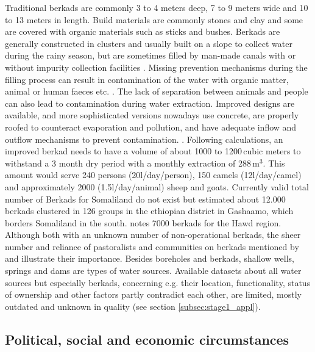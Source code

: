 Traditional berkads are commonly 3 to 4 meters deep, 7 to 9 meters wide and 10 to 13 meters in length. Build materials are commonly stones and clay and some are covered with organic materials such as sticks and bushes. Berkads are generally constructed in clusters and usually built on a slope to collect water during the rainy season, but are sometimes filled by man-made canals with or without impurity collection facilities \autocite{walkerChangingPastoralismEthiopian1998}. Missing prevention mechanisms during the filling process can result in contamination of the water with organic matter, animal or human faeces etc. \autocite{mercycorpsIMPROVEDBERKADDESIGNS2017}. The lack of separation between animals and people can also lead to contamination during water extraction. Improved designs are available, and more sophisticated versions nowadays use concrete, are properly roofed to counteract evaporation and pollution, and have adequate inflow and outflow mechanisms to prevent contamination. \autocite{mercycorpsIMPROVEDBERKADDESIGNS2017, petrucciLandscapeLandformsNorthern2022}. Following \autocite{mercycorpsIMPROVEDBERKADDESIGNS2017} calculations, an improved berkad needs to have a volume of about 1000 to 1200\,cubic meters to  withstand a 3 month dry period with a monthly extraction of 288\,m$^3$. This amount would serve 240 persons (20l/day/person), 150 camels (12l/day/camel) and approximately 2000 (1.5l/day/animal) sheep and goats. Currently valid total number of Berkads for Somaliland do not exist but \autocite{walkerChangingPastoralismEthiopian1998} estimated about 12.000 berkads clustered in 126 groups in the ethiopian district in Gashaamo, which borders Somaliland in the south. \autocite{birchSomalilandSomaliRegion2008} notes 7000 berkads for the Hawd region. Although both with an unknown number of non-operational berkads, the sheer number and reliance of pastoralists and communities on berkads mentioned by \autocite{walkerChangingPastoralismEthiopian1998} and \autocite{birchSomalilandSomaliRegion2008} illustrate their importance. Besides boreholes and berkads, shallow wells, springs and dams are types of water sources. Available datasets about all water sources but especially berkads, concerning e.g. their location, functionality, status of ownership and other factors partly contradict each other, are limited, mostly outdated and unknown in quality (see section \ref{subsec:stage1_appl})\autocite{FAOSWALIMSomalia}. 

\subsection{Political, social and economic circumstances} %

